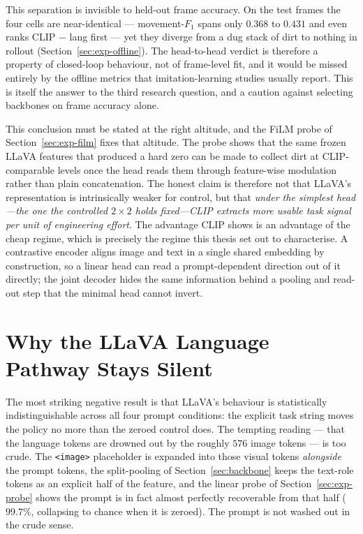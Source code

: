 This separation is invisible to held-out frame accuracy. On the test frames the
four cells are near-identical --- movement-$F_1$ spans only $0.368$ to $0.431$ and
even ranks CLIP $-$ lang first --- yet they diverge from a dug stack of dirt to
nothing in rollout (Section~\ref{sec:exp-offline}). The head-to-head verdict is therefore a
property of closed-loop behaviour, not of frame-level fit, and it would be missed
entirely by the offline metrics that imitation-learning studies usually report.
This is itself the answer to the third research question, and a caution against
selecting backbones on frame accuracy alone.

This conclusion must be stated at the right altitude, and the FiLM probe of
Section~\ref{sec:exp-film} fixes that altitude. The probe shows that the same
frozen LLaVA features that produced a hard zero can be made to collect dirt at
CLIP-comparable levels once the head reads them through feature-wise modulation
rather than plain concatenation. The honest claim is therefore not that LLaVA's
representation is intrinsically weaker for control, but that \emph{under the
simplest head---the one the controlled $2\times2$ holds fixed---CLIP extracts
more usable task signal per unit of engineering effort}. The advantage CLIP
shows is an advantage of the cheap regime, which is precisely the regime this
thesis set out to characterise. A contrastive encoder aligns image and text in a
single shared embedding by construction, so a linear head can read a
prompt-dependent direction out of it directly; the joint decoder hides the same
information behind a pooling and read-out step that the minimal head cannot
invert.

\section{Why the LLaVA Language Pathway Stays Silent}
\label{sec:disc-washout}

The most striking negative result is that LLaVA's behaviour is statistically
indistinguishable across all four prompt conditions: the explicit task string
moves the policy no more than the zeroed control does. The tempting reading ---
that the language tokens are drowned out by the roughly $576$ image tokens --- is
too crude. The \texttt{<image>} placeholder is expanded into those visual tokens
\emph{alongside} the prompt tokens, the split-pooling of Section~\ref{sec:backbone}
keeps the text-role tokens as an explicit half of the feature, and the linear
probe of Section~\ref{sec:exp-probe} shows the prompt is in fact almost perfectly
recoverable from that half ($99.7\%$, collapsing to chance when it is zeroed). The
prompt is not washed out in the crude sense.

